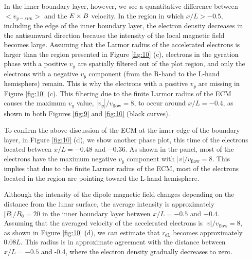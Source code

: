 \documentclass[draft,jgrga]{agutex2015}
\begin{document}
\begin{article}


In the inner boundary layer, however, 
we see a quantitative difference between 
$<v_{y-sim}>$ and 
the $\mbox{\boldmath $E$} \times \mbox{\boldmath $B$}$ velocity.
In the region in which $x/L > -0.5$, including the edge of the inner boundary layer, 
the electron density decreases in the antisunward direction 
because the intensity of the local magnetic field becomes large.
Assuming that the Larmor radius of the accelerated electrons
is larger than the region presented in Figure \ref{fig:10} (c), 
electrons in the gyration phase with a positive $v_y$ are 
spatially filtered out of the plot region,
and only the electrons with a negative $v_y$ component
(from the R-hand to the L-hand hemisphere) remain.
This is why the electrons with a positive $v_y$ 
are missing in Figure \ref{fig:10} (c).
This filtering due to the finite Larmor radius of the ECM 
causes the maximum $v_y$ value, $|v_y|/v_\mathrm{flow}=8$, to occur  
around $x/L = -0.4$, as
shown in both Figures \ref{fig:9} and \ref{fig:10} (black curves). 

To confirm the above discussion of the ECM 
at the inner edge of the boundary layer, in Figure \ref{fig:10} (d),
we show another phase plot, this time of the electrons located between 
$x/L = -0.48$ and $-0.36$.
As shown in the panel, 
most of the electrons have the maximum negative $v_y$ component 
with $|v|/v_\mathrm{flow}=8$. 
This implies that 
due to the finite Larmor radius of the ECM, 
most of the electrons located in the region 
are pointing toward
the L-hand hemisphere. 

Although the intensity of the dipole magnetic field changes depending on 
the distance from the lunar surface, 
the average intensity is approximately $|B|/B_{\mathrm{0}}=20$ 
in the inner boundary layer between $x/L = -0.5$ and $-0.4$.
Assuming that the averaged velocity of the accelerated electrons is 
$|v|/v_\mathrm{flow}=8$, as shown in Figure \ref{fig:10} (d),
we can estimate that $r_\mathrm{eL}$ becomes approximately $0.08L$.
This radius is in approximate agreement with the distance 
between $x/L = -0.5$ and -0.4, where
the electron density gradually decreases to zero.


\end{article}
\end{document}
